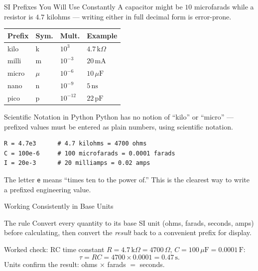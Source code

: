 \documentclass[9pt,aspectratio=169,xcolor=table]{beamer}
\newcommand{\striped}{\rowcolors{1}{white}{stripe}}
\begin{document}
\begin{frame}{SI Prefixes You Will Use Constantly}
    \leavevmode
    \small
    A capacitor might be $10$ microfarads while a resistor is
    $4.7$ kilohms --- writing either in full decimal form is error-prone.

    \vspace{2mm}
    \striped
    \begin{center}
    \begin{tabular}{llll}
        \toprule
        \textbf{Prefix} & \textbf{Sym.} & \textbf{Mult.} & \textbf{Example} \\
        \midrule
        kilo  & k      & $10^{3}$   & $4.7\,\text{k}\Omega$ \\
        milli & m      & $10^{-3}$  & $20\,\text{mA}$ \\
        micro & $\mu$  & $10^{-6}$  & $10\,\mu\text{F}$ \\
        nano  & n      & $10^{-9}$  & $5\,\text{ns}$ \\
        pico  & p      & $10^{-12}$ & $22\,\text{pF}$ \\
        \bottomrule
    \end{tabular}
    \end{center}
\end{frame}

\begin{frame}[fragile]{Scientific Notation in Python}
    \leavevmode
    Python has no notion of ``kilo'' or ``micro'' --- prefixed values
    must be entered as plain numbers, using \alert{scientific notation}.

\begin{lstlisting}
R = 4.7e3      # 4.7 kilohms = 4700 ohms
C = 100e-6     # 100 microfarads = 0.0001 farads
I = 20e-3      # 20 milliamps = 0.02 amps
\end{lstlisting}

    \vspace{2mm}
    {\small The letter \texttt{e} means ``times ten to the power of.''
    This is the clearest way to write a prefixed engineering value.}
\end{frame}

\begin{frame}{Working Consistently in Base Units}
    \leavevmode
    \begin{block}{The rule}
        Convert every quantity to its \alert{base SI unit} (ohms, farads,
        seconds, amps) before calculating, then convert the \emph{result}
        back to a convenient prefix for display.
    \end{block}

    \vspace{3mm}
    \begin{alertblock}{Worked check: RC time constant}
        $R = 4.7\,\text{k}\Omega = 4700\,\Omega$, $C = 100\,\mu\text{F} =
        0.0001\,\text{F}$:
        \[
        \tau = RC = 4700 \times 0.0001 = 0.47\,\text{s}.
        \]
        Units confirm the result: ohms $\times$ farads $=$ seconds.
    \end{alertblock}
\end{frame}
\end{document}
